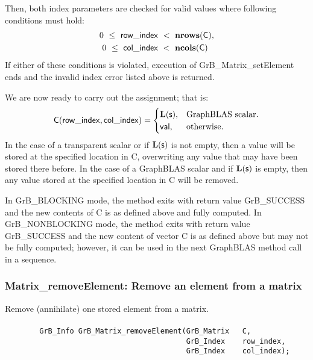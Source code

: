 Then, both index parameters are checked for valid values where following
conditions must hold:
\[
\begin{aligned}
    0\ \leq\ {\sf row\_index} & \ <\ \mathbf{nrows}({\sf C}), \\
    0\ \leq\ {\sf col\_index} & \ <\ \mathbf{ncols}({\sf C})
\end{aligned}
\]
If either of these conditions is violated, execution of 
{\sf GrB\_Matrix\_setElement} ends and the invalid 
index error listed above is returned. 

We are now ready to carry out the assignment; that is: 
\begin{equation*}
    {\sf C}({\sf row\_index},{\sf col\_index}) =
    \begin{cases}
     \mathbf{L}({\sf s}),  & \text{GraphBLAS scalar.} \\
     {\sf val}, & \text{otherwise.}
    \end{cases}
\end{equation*}
In the case of a transparent scalar or if $\mathbf{L}({\sf s})$ is not empty, then a value will be stored at the specified
location in {\sf C}, overwriting any value that may have been stored there before.
In the case of a GraphBLAS scalar and if $\mathbf{L}({\sf s})$ is empty, then any
value stored at the specified location in {\sf C} will be removed.

In {\sf GrB\_BLOCKING} mode, the method exits with return value 
{\sf GrB\_SUCCESS} and the new contents of {\sf C} is as defined above
and fully computed.  
In {\sf GrB\_NONBLOCKING} mode, the method exits with return value 
{\sf GrB\_SUCCESS} and the new content of vector {\sf C} is as defined above 
but may not be fully computed; however, it can be used in the next GraphBLAS 
method call in a sequence.


\subsubsection{{\sf Matrix\_removeElement}: Remove an element from a matrix}

Remove (annihilate) one stored element from a matrix.

\paragraph{\syntax}

\begin{verbatim}
        GrB_Info GrB_Matrix_removeElement(GrB_Matrix   C,
                                          GrB_Index    row_index,
                                          GrB_Index    col_index); 
\end{verbatim}

